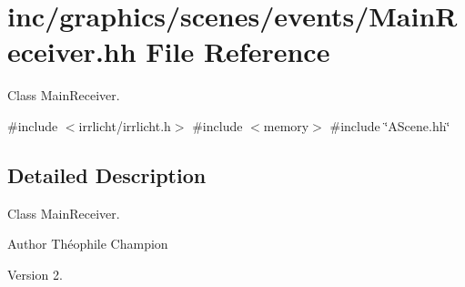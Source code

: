 \hypertarget{MainReceiver_8hh}{}\section{inc/graphics/scenes/events/\+Main\+Receiver.hh File Reference}
\label{MainReceiver_8hh}


Class Main\+Receiver.  


{\ttfamily \#include $<$irrlicht/irrlicht.\+h$>$}\newline
{\ttfamily \#include $<$memory$>$}\newline
{\ttfamily \#include \char`\"{}A\+Scene.\+hh\char`\"{}}\newline


\subsection{Detailed Description}
Class Main\+Receiver. 

\begin{DoxyAuthor}{Author}
Théophile Champion 
\end{DoxyAuthor}
\begin{DoxyVersion}{Version}
2. 
\end{DoxyVersion}
